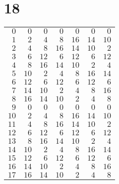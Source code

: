 \documentclass[a4paper]{scrartcl}
\begin{document}
\section*{18}
\begin{tabular}{rrrrrrr}
\toprule
$0$ & $0$ & $0$ & $0$ & $0$ & $0$ & $0$ \\
$1$ & $2$ & $4$ & $8$ & $16$ & $14$ & $10$ \\
$2$ & $4$ & $8$ & $16$ & $14$ & $10$ & $2$ \\
$3$ & $6$ & $12$ & $6$ & $12$ & $6$ & $12$ \\
$4$ & $8$ & $16$ & $14$ & $10$ & $2$ & $4$ \\
$5$ & $10$ & $2$ & $4$ & $8$ & $16$ & $14$ \\
$6$ & $12$ & $6$ & $12$ & $6$ & $12$ & $6$ \\
$7$ & $14$ & $10$ & $2$ & $4$ & $8$ & $16$ \\
$8$ & $16$ & $14$ & $10$ & $2$ & $4$ & $8$ \\
$9$ & $0$ & $0$ & $0$ & $0$ & $0$ & $0$ \\
$10$ & $2$ & $4$ & $8$ & $16$ & $14$ & $10$ \\
$11$ & $4$ & $8$ & $16$ & $14$ & $10$ & $2$ \\
$12$ & $6$ & $12$ & $6$ & $12$ & $6$ & $12$ \\
$13$ & $8$ & $16$ & $14$ & $10$ & $2$ & $4$ \\
$14$ & $10$ & $2$ & $4$ & $8$ & $16$ & $14$ \\
$15$ & $12$ & $6$ & $12$ & $6$ & $12$ & $6$ \\
$16$ & $14$ & $10$ & $2$ & $4$ & $8$ & $16$ \\
$17$ & $16$ & $14$ & $10$ & $2$ & $4$ & $8$ \\
\bottomrule
\end{tabular}
\end{document}
